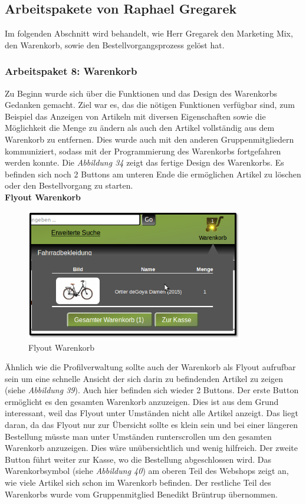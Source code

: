 \newpage
\subsection{Arbeitspakete von Raphael Gregarek}
Im folgenden Abschnitt wird behandelt, wie Herr Gregarek den Marketing Mix, den Warenkorb, sowie den Bestellvorgangsprozess gelöst hat.

\subsubsection{Arbeitspaket 8: Warenkorb}
Zu Beginn wurde sich über die Funktionen und das Design des Warenkorbs Gedanken gemacht. Ziel war es, das die nötigen Funktionen verfügbar sind, zum Beispiel das Anzeigen von Artikeln mit diversen Eigenschaften sowie die Möglichkeit die Menge zu ändern als auch den Artikel vollständig aus dem Warenkorb zu entfernen. Dies wurde auch mit den anderen Gruppenmitgliedern kommuniziert, sodass mit der Programmierung des Warenkorbs fortgefahren werden konnte. Die \textit{Abbildung 34} zeigt das fertige Design des Warenkorbs. Es befinden sich noch 2 Buttons am unteren Ende die ermöglichen Artikel zu löschen oder den Bestellvorgang zu starten.\\

\textbf{Flyout Warenkorb}\\
\begin{figure}[H]
	\begin{center}
			\includegraphics[width=95mm]{Bilder/warenkorb_flyout.png}
	\end{center}
	\caption{Flyout Warenkorb}
\end{figure}

Ähnlich wie die Profilverwaltung sollte auch der Warenkorb als Flyout aufrufbar sein um eine schnelle Ansicht der sich darin zu befindenden Artikel zu zeigen (siehe \textit{Abbildung 39}). Auch hier befinden sich wieder 2 Buttons. Der erste Button ermöglicht es den gesamten Warenkorb anzuzeigen. Dies ist aus dem Grund interessant, weil das Flyout unter Umständen nicht alle Artikel anzeigt. Das liegt daran, da das Flyout nur zur Übersicht sollte es klein sein und bei einer längeren Bestellung müsste man unter Umständen runterscrollen um den gesamten Warenkorb anzuzeigen. Dies wäre unübersichtlich und wenig hilfreich. Der zweite Button führt weiter zur Kasse, wo die Bestellung abgeschlossen wird. Das Warenkorbsymbol  (siehe \textit{Abbildung 40}) am oberen Teil des Webshops zeigt an, wie viele Artikel sich schon im Warenkorb befinden. Der restliche Teil des Warenkorbs wurde vom Gruppenmitglied Benedikt Brüntrup übernommen.

